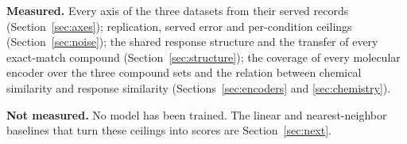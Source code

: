 \begin{keybox}
\textbf{Measured.} Every axis of the three datasets from their served records
(Section~\ref{sec:axes}); replication, served error and per-condition ceilings
(Section~\ref{sec:noise}); the shared response structure and the transfer of every
exact-match compound (Section~\ref{sec:structure}); the coverage of every molecular
encoder over the three compound sets and the relation between chemical similarity and
response similarity (Sections~\ref{sec:encoders} and \ref{sec:chemistry}).

\textbf{Not measured.} No model has been trained. The linear and nearest-neighbor
baselines that turn these ceilings into scores are Section~\ref{sec:next}.
\end{keybox}
